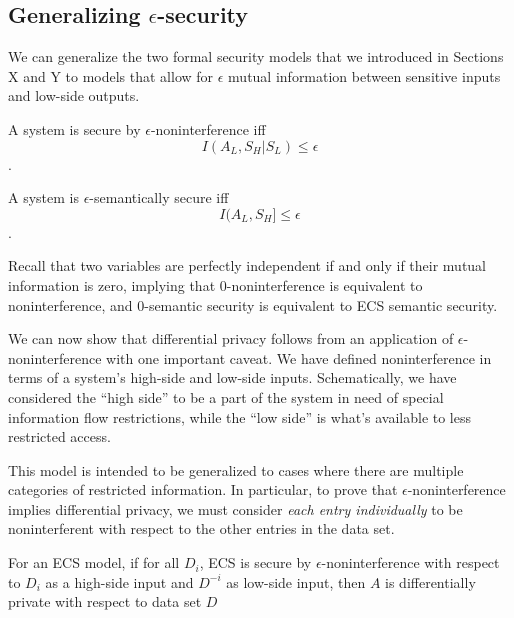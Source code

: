 \documentclass[../thesis.tex]{subfiles}
\begin{document}
\subsection{Generalizing $\epsilon$-security}

We can generalize the two formal security models
that we introduced in Sections X and Y to models
that allow for $\epsilon$ mutual information between
sensitive inputs and low-side outputs.

\begin{dfn}
  A system is secure by $\epsilon$-noninterference iff 
  $$I(A_L, S_H \vert S_L) \leq \epsilon$$.
\end{dfn}

\begin{dfn}
  A system is $\epsilon$-semantically secure iff 
  $$I(A_L, S_H] \leq \epsilon$$.
\end{dfn}

Recall that two variables are perfectly independent
if and only if their mutual information is zero,
implying that $0$-noninterference is equivalent to
noninterference, and $0$-semantic security is equivalent
to ECS semantic security.

We can now show that differential privacy follows
from an application of $\epsilon$-noninterference
with one important caveat.
We have defined noninterference in terms of a system's
high-side and low-side inputs.
Schematically, we have considered the ``high side'' to
be a part of the system in need of special information
flow restrictions, while the ``low side'' is what's
available to less restricted access.

This model is intended to be generalized to cases where
there are multiple categories of restricted information.
In particular, to prove that $\epsilon$-noninterference
implies differential privacy, we must consider
\emph{each entry individually} to be noninterferent
with respect to the other entries in the data set.

\begin{thm}
  For an ECS model, if for all $D_i$,
  ECS is secure by $\epsilon$-noninterference with
  respect to $D_i$ as a high-side input and $D^{-i}$
  as low-side input, then $A$ is differentially
  private with respect to data set $D$
\end{thm}
\end{document}
